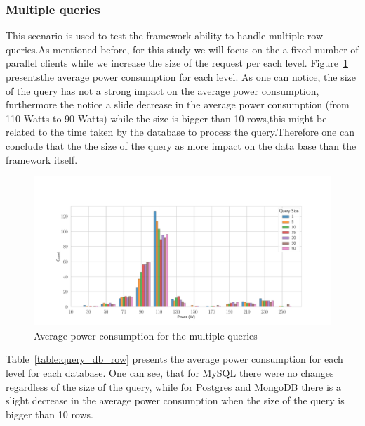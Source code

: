 \subsubsection{Multiple queries}

This scenario is used to test the framework ability to handle multiple row queries.As mentioned before,  for this study we will focus on the a fixed number of parallel clients while we increase the size of the request per each level.
Figure~\ref{fig:av_power_query} presentsthe average power consumption for each level. As one can notice, the size of the query has not a strong impact on the average power consumption, furthermore the notice a slide decrease in the average power consumption (from 110 Watts to 90 Watts) while the size is bigger than 10 rows,this might be related to the time taken by the database to process the query.Therefore one can conclude that the the size of the query as more impact on the data base than the framework itself.
\begin{figure}[hbt]
    \centering
    \includegraphics[width=
        \columnwidth]{imgs/histogram_av_power_cpu_query}
    \caption{Average power consumption for the multiple queries }
    \label{fig:av_power_query}
\end{figure}
Table~\ref{table:query_db_row} presents the average power consumption for each level for each database. One can see, that for MySQL there were no changes regardless of the size of the query, while for Postgres and MongoDB there is a slight decrease in the average power consumption when the size of the query is bigger than 10 rows.


